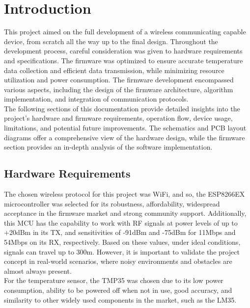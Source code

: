 \newpage

\section{Introduction}\label{01Sec:Introduction}

This project aimed on the full development of a wireless communicating capable device,
from scratch all the way up to the final design. Throughout the development process, careful consideration
was given to hardware requirements and specifications. The firmware was optimized to ensure accurate temperature data
collection and efficient data transmission, while minimizing resource utilization and power consumption.
The firmware development encompassed various aspects, including the design of the firmware architecture,
algorithm implementation, and integration of communication protocols. \\ 

The following sections of this documentation provide detailed insights into the project's hardware and firmware
requirements, operation flow, device usage, limitations, and potential future improvements. The schematics and PCB layout
diagrams offer a comprehensive view of the hardware design, while the firmware section provides an in-depth analysis of the 
software implementation.


\subsection{Hardware Requirements}\label{01Sub:HardwareRequirements}

The chosen wireless protocol for this project was WiFi, and so, the ESP8266EX microcontroller was selected for its robustness, 
affordability, widespread acceptance in the firmware market and strong community support. Additionally, this MCU has the capability 
to work with RF signals at power levels of up to +20dBm in its TX, and sensitivities of -91dBm and -75dBm for 11Mbps and 54Mbps on 
its RX, respectively. Based on these values, under ideal conditions, signals can travel up to 300m. However, it is important to 
validate the project concept in real-world scenarios, where noisy environments and obstacles are almost always present. \\ 

For the temperature sensor, the TMP35 was chosen due to its low power consumption, ability to be powered off when not in use, 
good accuracy, and similarity to other widely used components in the market, such as the LM35. \\ 

